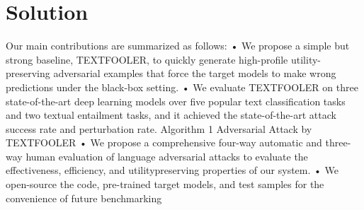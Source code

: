 
\section{Solution}\label{sec:solution}


Our main contributions are summarized as follows:
• We propose a simple but strong baseline, TEXTFOOLER, to quickly generate high-profile utility-preserving adversarial examples that force the target models to make wrong predictions under the black-box setting.
• We evaluate TEXTFOOLER on three state-of-the-art deep learning models over five popular text classification tasks and two textual entailment tasks, and it achieved the state-of-the-art attack success rate and perturbation rate. Algorithm 1 Adversarial Attack by TEXTFOOLER
• We propose a comprehensive four-way automatic and three-way human evaluation of language adversarial attacks to evaluate the effectiveness, efficiency, and utilitypreserving properties of our system.
• We open-source the code, pre-trained target models, and test samples for the convenience of future benchmarking

